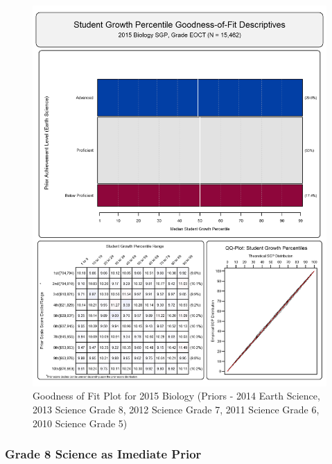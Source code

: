 \documentclass[12pt]{article}
\begin{document}
\begin{figure}[htbp]
\centering
\includegraphics{../img/Goodness_of_Fit/BIOLOGY.2015/2015_BIOLOGY_EOCT;2014_EARTH_SCIENCE_EOCT;2013_SCIENCE_8;2012_SCIENCE_7;2011_SCIENCE_6;2010_SCIENCE_5.png}
\caption{Goodness of Fit Plot for 2015 Biology (Priors - 2014 Earth
Science, 2013 Science Grade 8, 2012 Science Grade 7, 2011 Science Grade
6, 2010 Science Grade 5)}
\end{figure}

\clearpage 

\subsubsection{Grade 8 Science as Imediate
Prior}\label{grade-8-science-as-imediate-prior}
\end{document}
